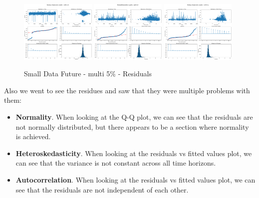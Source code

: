 \documentclass[11pt,english,a4paper,hidelinks]{book}
\begin{document}
\begin{figure}[H]
    \centering
    \includegraphics[width=0.32\textwidth]{images/code/models/linear_regression/first_model/Multi/quality_profit_1m_residuals.png}
    \includegraphics[width=0.32\textwidth]{images/code/models/linear_regression/first_model/Multi/quality_profit_1y_residuals.png}
    \includegraphics[width=0.32\textwidth]{images/code/models/linear_regression/first_model/Multi/quality_profit_5y_residuals.png}
    \caption{Small Data Future - \acrshort{multi} 5\% - Residuals}
    \label{fig:first_linear_regression_residuals}
\end{figure}

\vspace{0.5cm}
\noindent Also we went to see the residues and saw that they were multiple problems with them:

\begin{itemize}
    \item \textbf{Normality}. When looking at the Q-Q plot, we can see that the residuals are not normally distributed, but there appears to be a section where normality is achieved.
    \item \textbf{Heteroskedasticity}. When looking at the residuals vs fitted values plot, we can see that the variance is not constant across all time horizons.
    \item \textbf{Autocorrelation}. When looking at the residuals vs fitted values plot, we can see that the residuals are not independent of each other.
\end{itemize}
\end{document}
